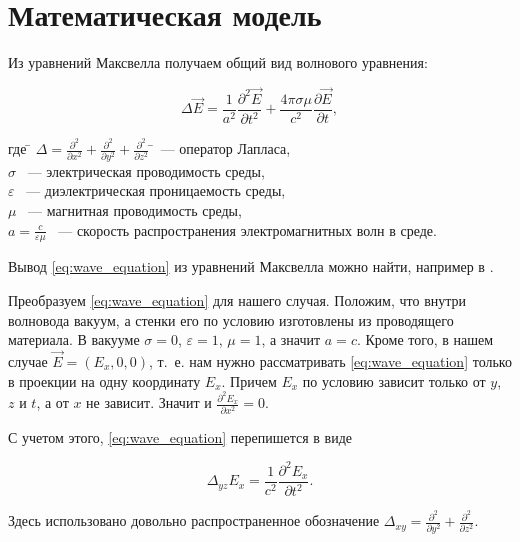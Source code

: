 \chapter{Математическая модель}

Из уравнений Максвелла получаем общий вид волнового уравнения:

\begin{equation}
\label{eq:wave_equation}
\Delta \vec{E} = \frac{1}{a^2} \frac{\partial^2 \vec{E}}{\partial t^2} + \frac{4 \pi \sigma \mu}{c^2} \frac{\partial \vec{E}}{\partial t},
\end{equation}

\begin{tabbing}
где \= $\Delta = \frac{\partial^2}{\partial x^2} + \frac{\partial^2}{\partial y^2} + \frac{\partial^2}{\partial z^2}$ \=~--- оператор Лапласа,\\
\> $\sigma$ \>~--- электрическая проводимость среды,\\
\>$\varepsilon$ \>~--- диэлектрическая проницаемость среды,\\
\>$\mu$ \>~--- магнитная проводимость среды,\\
\>$a = \frac{c}{\varepsilon \mu}$ \>~--- скорость распространения электромагнитных волн в среде.
\end{tabbing}

Вывод \eqref{eq:wave_equation} из уравнений Максвелла можно найти, например в \cite{samarsky}.

Преобразуем \eqref{eq:wave_equation} для нашего случая. Положим, что внутри волновода вакуум, а стенки его по условию изготовлены из проводящего материала. В вакууме $\sigma = 0$, $\varepsilon = 1$, $\mu = 1$, а значит $a = c$. Кроме того, в нашем случае $\vec{E} = \left( E_x, 0, 0\right)$, т.~е. нам нужно рассматривать \eqref{eq:wave_equation} только в проекции на одну координату $E_x$. Причем $E_x$ по условию зависит только от $y$, $z$ и $t$, а от $x$ не зависит. Значит и $\frac{\partial^2 E_x}{\partial x^2} = 0$.

С учетом этого, \eqref{eq:wave_equation} перепишется в виде

\begin{equation}
\label{eq:wave_equation_2}
\Delta_{yz} E_x = \frac{1}{c^2} \frac{\partial^2 E_x}{\partial t^2}.
\end{equation}

Здесь использовано довольно распространенное обозначение $\Delta_{xy} = \frac{\partial^2}{\partial y^2} + \frac{\partial^2}{\partial z^2}$.

